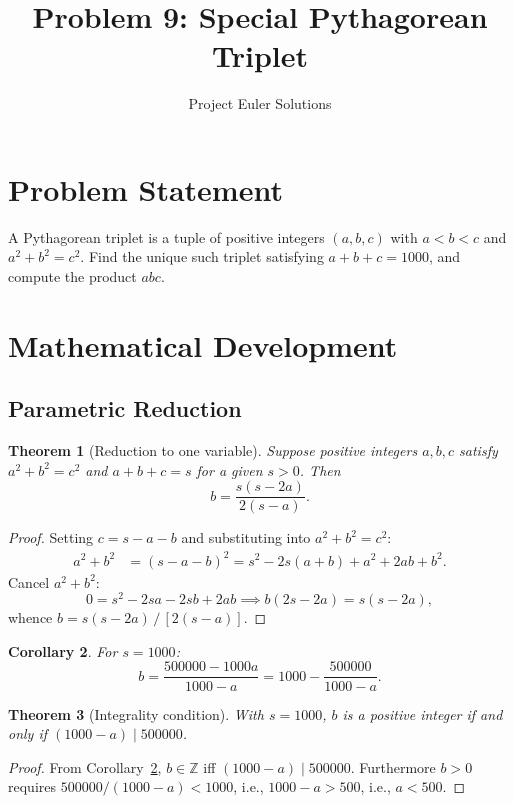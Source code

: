 \documentclass[11pt]{article}
\title{Problem 9: Special Pythagorean Triplet}
\author{Project Euler Solutions}
\date{}
\newtheorem{theorem}{Theorem}
\newtheorem{corollary}[theorem]{Corollary}
\begin{document}
\maketitle

\section{Problem Statement}

A Pythagorean triplet is a tuple of positive integers $(a, b, c)$ with $a < b < c$ and $a^2 + b^2 = c^2$. Find the unique such triplet satisfying $a + b + c = 1000$, and compute the product $abc$.

\section{Mathematical Development}

\subsection{Parametric Reduction}

\begin{theorem}[Reduction to one variable]\label{thm:reduce}
Suppose positive integers $a, b, c$ satisfy $a^2 + b^2 = c^2$ and $a + b + c = s$ for a given $s > 0$. Then
\[
b = \frac{s(s - 2a)}{2(s - a)}.
\]
\end{theorem}

\begin{proof}
Setting $c = s - a - b$ and substituting into $a^2 + b^2 = c^2$:
\begin{align*}
a^2 + b^2 &= (s - a - b)^2 = s^2 - 2s(a+b) + a^2 + 2ab + b^2.
\end{align*}
Cancel $a^2 + b^2$:
\[
0 = s^2 - 2sa - 2sb + 2ab \implies b(2s - 2a) = s(s - 2a),
\]
whence $b = s(s-2a)\,/\,[2(s-a)]$.
\end{proof}

\begin{corollary}\label{cor:formula}
For $s = 1000$:
\[
b = \frac{500000 - 1000a}{1000 - a} = 1000 - \frac{500000}{1000 - a}.
\]
\end{corollary}

\begin{theorem}[Integrality condition]\label{thm:int}
With $s = 1000$, $b$ is a positive integer if and only if $(1000 - a) \mid 500000$.
\end{theorem}

\begin{proof}
From Corollary~\ref{cor:formula}, $b \in \mathbb{Z}$ iff $(1000 - a) \mid 500000$. Furthermore $b > 0$ requires $500000/(1000 - a) < 1000$, i.e., $1000 - a > 500$, i.e., $a < 500$.
\end{proof}
\end{document}
